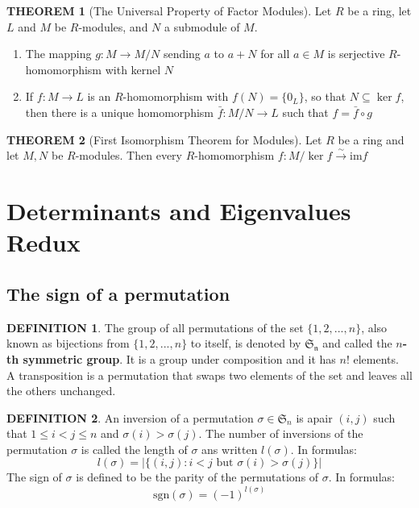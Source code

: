 \documentclass[10pt]{article}
\theoremstyle{definition}
\newtheorem{definition}{DEFINITION}[subsection]
\newtheorem{theorem}{THEOREM}[subsection]
\newcommand{\image}{\text{im}}
\begin{document}
\begin{theorem}[The Universal Property of Factor Modules]
    Let $R$ be a ring, let $L$ and $M$ be $R$-modules, and $N$ a submodule of $M$.
    \begin{enumerate}
        \item The mapping $g: M \rightarrow M/N$ sending $a$ to $a+N$ for all $a \in M$ is serjective $R$-homomorphism with kernel $N$
        \item If $f:M \rightarrow L$ is an $R$-homomorphism with $f(N) = \{0_L\}$, so that $N \subseteq \ker f$, then there is a unique homomorphism $\bar{f}:M/N \rightarrow L$ such that $f = \bar{f}\circ g$
    \end{enumerate}
\end{theorem}

\begin{theorem}[First Isomorphism Theorem for Modules]
    Let $R$ be a ring and let $M,N$ be $R$-modules. Then every $R$-homomorphism $f:M/\ker f \stackrel{\sim}{\rightarrow} \image f$
\end{theorem}


\section{Determinants and Eigenvalues Redux}
\subsection{The sign of a permutation}
\begin{definition}
    The group of all permutations of the set $\{1,2,...,n\}$, also known as bijections from $\{1,2,...,n\}$ to itself, is denoted by $\mathfrak{S_n}$ and called the $n$\textbf{-th symmetric group}. It is a group under composition and it has $n!$ elements.\\
    A transposition is a permutation that swaps two elements of the set and leaves all the others unchanged.
\end{definition}

\begin{definition}
    An inversion of a permutation $\sigma \in \mathfrak{S}_n$ is  apair $(i,j)$ such that $1 \leq i < j \leq n$ and $\sigma(i) > \sigma(j)$. The number of inversions of the permutation $\sigma$ is called the length of $\sigma$ ans written $l(\sigma)$. In formulas:
    $$l(\sigma) = |\{(i,j): i < j \text{ but } \sigma(i) > \sigma(j)\}|$$
    The sign of $\sigma$ is defined to be the parity of the permutations of $\sigma$. In formulas:
    $$\text{sgn}(\sigma) = (-1)^{l(\sigma)}$$
\end{definition}
\end{document}
